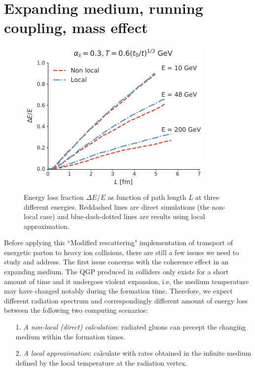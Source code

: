 \documentclass[aps, prc, reprint, amsmath, groupedaddress, nofootinbib]{revtex4-1}
\begin{document}
\section{Expanding medium, running coupling, mass effect}\label{section:disscuss}
\begin{figure}
\includegraphics[width=\columnwidth]{Bjorken.pdf}
\caption{Energy loss fraction $\Delta E /E$ as function of path length $L$ at three different energies. Reddashed lines are direct simulations (the non-local case) and blue-dash-dotted lines are results using local approximation.}
\label{fig:Bjorken}
\end{figure}
Before applying this ``Modified rescattering" implementation of transport of energetic parton to heavy ion collisions, there are still a few issues we need to study and address.
The first issue concerns with the coherence effect in an expanding medium. 
The QGP produced in colliders only exists for a short amount of time and it undergoes violent expansion, i.e, the medium temperature may have changed notably during the formation time.
Therefore, we expect different radiation spectrum and correspondingly different amount of energy loss between the following two computing scenarios:
\begin{itemize}
\item[1.]  {\it A non-local (direct) calculation}: radiated gluons can precept the changing medium within the formation times.
\item[2.] {\it A local approximation}: calculate with rates obtained in the infinite medium defined by the local temperature at the radiation vertex.
\end{itemize} 
\end{document}
